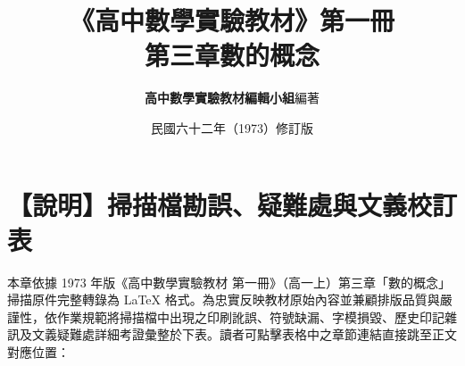 \documentclass[a4paper,12pt,twoside]{article}
\title{\LARGE\textbf{《高中數學實驗教材》第一冊}\\[0.5em] \Large\textbf{第三章\quad 數的概念}}
\author{\textbf{高中數學實驗教材編輯小組}\quad 編著}
\date{民國六十二年（1973）修訂版}
\begin{document}
\maketitle
\thispagestyle{firstpage}

\section*{【說明】掃描檔勘誤、疑難處與文義校訂表}
\label{sec:errata_notes}

本章依據 1973 年版《高中數學實驗教材 第一冊》（高一上）第三章「數的概念」掃描原件完整轉錄為 \LaTeX{} 格式。為忠實反映教材原始內容並兼顧排版品質與嚴謹性，依作業規範將掃描檔中出現之印刷訛誤、符號缺漏、字模損毀、歷史印記雜訊及文義疑難處詳細考證彙整於下表。讀者可點擊表格中之章節連結直接跳至正文對應位置：
\end{document}
